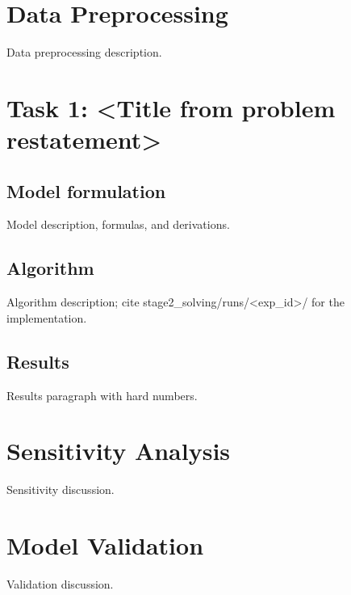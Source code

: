 
\section{Data Preprocessing}
Data preprocessing description.

\section{Task 1: <Title from problem restatement>}
\subsection{Model formulation}
Model description, formulas, and derivations.

\subsection{Algorithm}
Algorithm description; cite stage2_solving/runs/<exp_id>/ for the implementation.

\subsection{Results}
Results paragraph with hard numbers.


\section{Sensitivity Analysis}
Sensitivity discussion.

\section{Model Validation}
Validation discussion.
